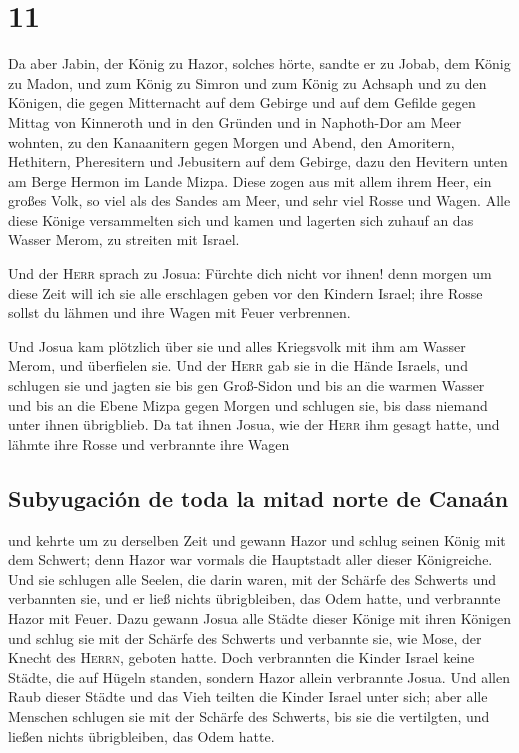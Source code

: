\hypertarget{section-10}{%
\section{11}\label{section-10}}

 Da aber Jabin, der König zu Hazor, solches hörte, sandte
er zu Jobab, dem König zu Madon, und zum König zu Simron und zum König
zu Achsaph  und zu den Königen, die gegen Mitternacht auf
dem Gebirge und auf dem Gefilde gegen Mittag von Kinneroth und in den
Gründen und in Naphoth-Dor am Meer wohnten,  zu den
Kanaanitern gegen Morgen und Abend, den Amoritern, Hethitern,
Pheresitern und Jebusitern auf dem Gebirge, dazu den Hevitern unten am
Berge Hermon im Lande Mizpa.  Diese zogen aus mit allem
ihrem Heer, ein großes Volk, so viel als des Sandes am Meer, und sehr
viel Rosse und Wagen.  Alle diese Könige versammelten sich
und kamen und lagerten sich zuhauf an das Wasser Merom, zu streiten mit
Israel.

 Und der \textsc{Herr} sprach zu Josua: Fürchte dich nicht
vor ihnen! denn morgen um diese Zeit will ich sie alle erschlagen geben
vor den Kindern Israel; ihre Rosse sollst du lähmen und ihre Wagen mit
Feuer verbrennen.

 Und Josua kam plötzlich über sie und alles Kriegsvolk mit
ihm am Wasser Merom, und überfielen sie.  Und der
\textsc{Herr} gab sie in die Hände Israels, und schlugen sie und jagten
sie bis gen Groß-Sidon und bis an die warmen Wasser und bis an die Ebene
Mizpa gegen Morgen und schlugen sie, bis dass niemand unter ihnen
übrigblieb.  Da tat ihnen Josua, wie der \textsc{Herr} ihm
gesagt hatte, und lähmte ihre Rosse und verbrannte ihre Wagen

\hypertarget{subyugaciuxf3n-de-toda-la-mitad-norte-de-canauxe1n}{%
\subsection{Subyugación de toda la mitad norte de
Canaán}\label{subyugaciuxf3n-de-toda-la-mitad-norte-de-canauxe1n}}

 und kehrte um zu derselben Zeit und gewann Hazor und
schlug seinen König mit dem Schwert; denn Hazor war vormals die
Hauptstadt aller dieser Königreiche.  Und sie schlugen
alle Seelen, die darin waren, mit der Schärfe des Schwerts und
verbannten sie, und er ließ nichts übrigbleiben, das Odem hatte, und
verbrannte Hazor mit Feuer.  Dazu gewann Josua alle
Städte dieser Könige mit ihren Königen und schlug sie mit der Schärfe
des Schwerts und verbannte sie, wie Mose, der Knecht des \textsc{Herrn},
geboten hatte.  Doch verbrannten die Kinder Israel keine
Städte, die auf Hügeln standen, sondern Hazor allein verbrannte Josua.
 Und allen Raub dieser Städte und das Vieh teilten die
Kinder Israel unter sich; aber alle Menschen schlugen sie mit der
Schärfe des Schwerts, bis sie die vertilgten, und ließen nichts
übrigbleiben, das Odem hatte.

